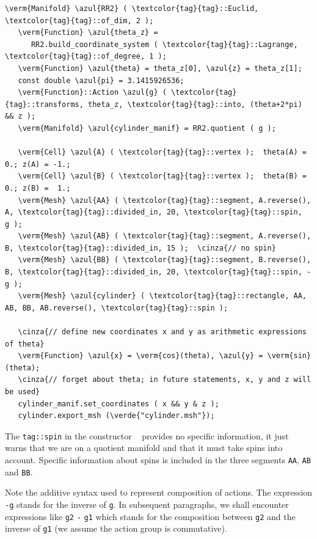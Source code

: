 \begin{Verbatim}[commandchars=\\\{\},formatcom=\small\tt,frame=single,
   label=parag-\ref{\numb section 7.\numb parag 3}.cpp,rulecolor=\color{coment},
   baselinestretch=0.94,framesep=2mm                                            ]
   \verm{Manifold} \azul{RR2} ( \textcolor{tag}{tag}::Euclid, \textcolor{tag}{tag}::of_dim, 2 );
   \verm{Function} \azul{theta_z} =
      RR2.build_coordinate_system ( \textcolor{tag}{tag}::Lagrange, \textcolor{tag}{tag}::of_degree, 1 );
   \verm{Function} \azul{theta} = theta_z[0], \azul{z} = theta_z[1];
   const double \azul{pi} = 3.1415926536;
   \verm{Function}::Action \azul{g} ( \textcolor{tag}{tag}::transforms, theta_z, \textcolor{tag}{tag}::into, (theta+2*pi) && z );
   \verm{Manifold} \azul{cylinder_manif} = RR2.quotient ( g );

   \verm{Cell} \azul{A} ( \textcolor{tag}{tag}::vertex );  theta(A) = 0.; z(A) = -1.;
   \verm{Cell} \azul{B} ( \textcolor{tag}{tag}::vertex );  theta(B) = 0.; z(B) =  1.;
   \verm{Mesh} \azul{AA} ( \textcolor{tag}{tag}::segment, A.reverse(), A, \textcolor{tag}{tag}::divided_in, 20, \textcolor{tag}{tag}::spin,  g );
   \verm{Mesh} \azul{AB} ( \textcolor{tag}{tag}::segment, A.reverse(), B, \textcolor{tag}{tag}::divided_in, 15 );  \cinza{// no spin}
   \verm{Mesh} \azul{BB} ( \textcolor{tag}{tag}::segment, B.reverse(), B, \textcolor{tag}{tag}::divided_in, 20, \textcolor{tag}{tag}::spin, -g );
   \verm{Mesh} \azul{cylinder} ( \textcolor{tag}{tag}::rectangle, AA, AB, BB, AB.reverse(), \textcolor{tag}{tag}::spin );

   \cinza{// define new coordinates x and y as arithmetic expressions of theta}
   \verm{Function} \azul{x} = \verm{cos}(theta), \azul{y} = \verm{sin}(theta);
   \cinza{// forget about theta; in future statements, x, y and z will be used}
   cylinder_manif.set_coordinates ( x && y & z );
   cylinder.export_msh (\verde{"cylinder.msh"});
\end{Verbatim}

The {\small\tt\textcolor{tag}{tag}::spin} in the constructor {\small\tt{} }
provides no specific information, it just warns {\maniFEM} that we are on a quotient manifold
and that it must take spins into account.
Specific information about spins is included in the three segments {\small\tt AA}, {\small\tt AB}
and {\small\tt BB}.

Note the additive syntax used to represent composition of actions.
The expression {\small\tt -g} stands for the inverse of {\small\tt g}.
In subsequent paragraphs, we shall encounter expressions like
{\small\tt g2} {\small\tt -} {\small\tt g1} which stands for the composition between
{\small\tt g2} and the inverse of {\small\tt g1} (we assume the action group is commutative).

